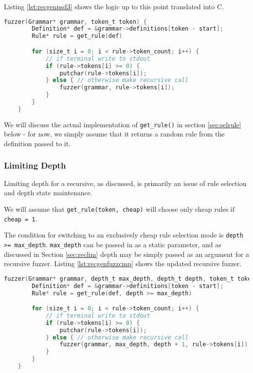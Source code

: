 \documentclass[8pt, twoside]{extarticle}
\begin{document}
Listing \ref{lst:recgenpsd3} shows the logic up to this point translated into C.

\begin{lstlisting}[gobble=2, language=C, caption={Rudimentary implementation}, label=lst:recgenpsd3] 
	fuzzer(Grammar* grammar, token_t token) {
		Definition* def = &grammar->definitions[token - start];
		Rule* rule = get_rule(def)

		for (size_t i = 0; i < rule->token_count; i++) {
			// if terminal write to stdout
			if (rule->tokens[i] >= 0) {
				putchar(rule->tokens[i]);
			} else { // otherwise make recursive call
				fuzzer(grammar, rule->tokens[i]);
			}
		}
	}
\end{lstlisting}

We will discuss the actual implementation of \verb|get_rule()| in section \ref{sec:selrule} below - for now, we simply assume that it returns a random rule from the definition passed to it.

\subsubsection{Limiting Depth}

Limiting depth for a recursive, as discussed, is primarily an issue of rule selection and depth state maintenance. 

We will assume that \verb|get_rule(token, cheap)| will choose only cheap rules if \verb|cheap = 1|. 

The condition for switching to an exclusively cheap rule selection mode is \verb|depth >= max_depth|. \verb|max_depth| can be passed in as a static parameter, and as discussed in Section \ref{sec:reclim} depth may be simply passed as an argument for a recursive fuzzer. Listing \ref{lst:recgenfuzzcmp} shows the updated recursive fuzzer.

\begin{lstlisting}[gobble=2, language=C, caption={Depth-limited generic recursive fuzzer}, label=lst:recgenfuzzcmp] 
	fuzzer(Grammar* grammar, depth_t max_depth, depth_t depth, token_t token) {
		Definition* def = &grammar->definitions[token - start];
		Rule* rule = get_rule(def, depth >= max_depth)

		for (size_t i = 0; i < rule->token_count; i++) {
			// if terminal write to stdout
			if (rule->tokens[i] >= 0) {
				putchar(rule->tokens[i]);
			} else { // otherwise make recursive call
				fuzzer(grammar, max_depth, depth + 1, rule->tokens[i]);
			}
		}
	}
\end{lstlisting}
\end{document}
